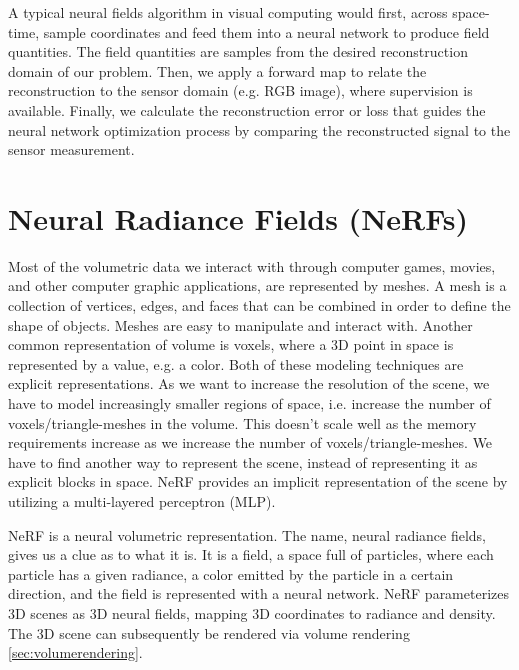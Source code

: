 A typical neural fields algorithm in visual computing would first, across space-time, sample coordinates and feed them into a neural network to produce field quantities. The field quantities are samples from the desired reconstruction domain of our problem. Then, we apply a forward map to relate the reconstruction to the sensor domain (e.g. RGB image), where supervision is available. Finally, we calculate the reconstruction error or loss that guides the neural network optimization process by comparing the reconstructed signal to the sensor measurement.




\section{Neural Radiance Fields (NeRFs)}
Most of the volumetric data we interact with through computer games, movies, and other computer graphic applications, are represented by meshes. A mesh is a collection of vertices, edges, and faces that can be combined in order to define the shape of objects. Meshes are easy to manipulate and interact with. Another common representation of volume is voxels, where a 3D point in space is represented by a value, e.g. a color. Both of these modeling techniques are explicit representations. As we want to increase the resolution of the scene, we have to model increasingly smaller regions of space, i.e. increase the number of voxels/triangle-meshes in the volume. This doesn't scale well as the memory requirements increase as we increase the number of voxels/triangle-meshes. We have to find another way to represent the scene, instead of representing it as explicit blocks in space. NeRF provides an implicit representation of the scene by utilizing a multi-layered perceptron (MLP).

NeRF is a neural volumetric representation. The name, neural radiance fields, gives us a clue as to what it is. It is a field, a space full of particles, where each particle has a given radiance, a color emitted by the particle in a certain direction, and the field is represented with a neural network. NeRF parameterizes 3D scenes as 3D neural fields, mapping 3D coordinates to radiance and density. The 3D scene can subsequently be rendered via volume rendering \autoref{sec:volumerendering}.


